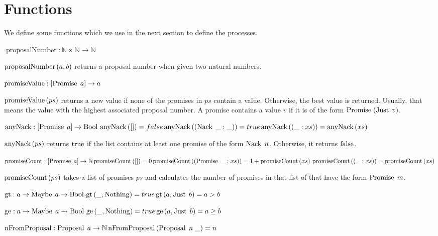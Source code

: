 \section{Functions}
We define some functions which we use in the next section to define the processes.

$\operatorname{proposalNumber} : \mathbb{N} \times \mathbb{N} \to \mathbb{N}$

$\operatorname{proposalNumber}\left( a, b \right)$ returns a proposal number when given two natural numbers.

$\operatorname{promiseValue} : [\operatorname{Promise}\; a] \to a$

$\operatorname{promiseValue}\left(ps\right)$ returns a new value if none of the promises in $ps$ contain a value. Otherwise, the best value is returned. Usually, that means the value with the highest associated proposal number.
A promise contains a value $v$ if it is of the form $\operatorname{Promise}\; (\operatorname{Just}\; v)$.

$\operatorname{anyNack} : [\operatorname{Promise}\; a] \to \operatorname{Bool}\\
\operatorname{anyNack}\left([]\right) = false\\
\operatorname{anyNack}\left(\left(\operatorname{Nack}\; \_: \_\right)\right) = true\\
\operatorname{anyNack}\left(\left(\_:xs\right)\right) = \operatorname{anyNack}\left(xs\right)$

$\operatorname{anyNack}\left(ps\right)$ returns $\operatorname{true}$ if the list contains at least one promise of the form $\operatorname{Nack}\; n$.
Otherwise, it returns $\operatorname{false}$.

$\operatorname{promiseCount} : [\operatorname{Promise}\; a] \to \mathbb{N}\\
\operatorname{promiseCount}\left([]\right) = 0\\
\operatorname{promiseCount}\left(\left(\operatorname{Promise}\; \_:xs\right)\right) = 1 + \operatorname{promiseCount}\left(xs\right)\\
\operatorname{promiseCount}\left(\left(\_:xs\right)\right) = \operatorname{promiseCount}\left(xs\right)$

$\operatorname{promiseCount}\left(ps\right)$ takes a list of promises $ps$ and calculates the number of promises in that list of that have the form $\operatorname{Promise}\; m$.

$\operatorname{gt}: a \to \operatorname{Maybe}\; a \to \operatorname{Bool}\\
\operatorname{gt}\left(\_, \operatorname{Nothing}\right) = true\\
\operatorname{gt}\left(a, \operatorname{Just}\; b\right) = a > b$

$\operatorname{ge}: a \to \operatorname{Maybe}\; a \to \operatorname{Bool}\\
\operatorname{ge}\left(\_, \operatorname{Nothing}\right) = true\\
\operatorname{ge}\left(a, \operatorname{Just}\; b\right) = a \ge b$

$\operatorname{nFromProposal} : \operatorname{Proposal}\; a \to \mathbb{N}\\
\operatorname{nFromProposal}\left(\operatorname{Proposal}\; n\; \_ \right) = n$

